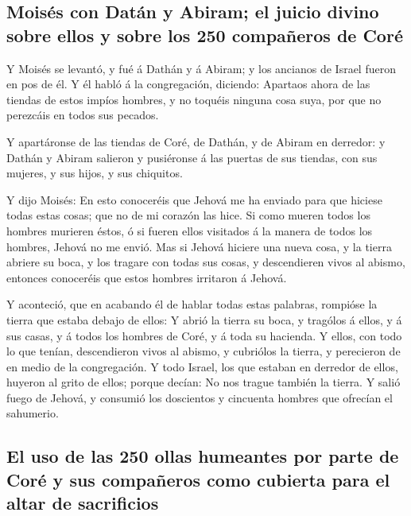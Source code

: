 \hypertarget{moisuxe9s-con-datuxe1n-y-abiram-el-juicio-divino-sobre-ellos-y-sobre-los-250-compauxf1eros-de-coruxe9}{%
\subsection{Moisés con Datán y Abiram; el juicio divino sobre ellos y
sobre los 250 compañeros de
Coré}\label{moisuxe9s-con-datuxe1n-y-abiram-el-juicio-divino-sobre-ellos-y-sobre-los-250-compauxf1eros-de-coruxe9}}

 Y Moisés se levantó, y fué á Dathán y á Abiram; y los
ancianos de Israel fueron en pos de él.  Y él habló á la
congregación, diciendo: Apartaos ahora de las tiendas de estos impíos
hombres, y no toquéis ninguna cosa suya, por que no perezcáis en todos
sus pecados.

 Y apartáronse de las tiendas de Coré, de Dathán, y de
Abiram en derredor: y Dathán y Abiram salieron y pusiéronse á las
puertas de sus tiendas, con sus mujeres, y sus hijos, y sus chiquitos.

 Y dijo Moisés: En esto conoceréis que Jehová me ha
enviado para que hiciese todas estas cosas; que no de mi corazón las
hice.  Si como mueren todos los hombres murieren éstos, ó
si fueren ellos visitados á la manera de todos los hombres, Jehová no me
envió.  Mas si Jehová hiciere una nueva cosa, y la tierra
abriere su boca, y los tragare con todas sus cosas, y descendieren vivos
al abismo, entonces conoceréis que estos hombres irritaron á Jehová.

 Y aconteció, que en acabando él de hablar todas estas
palabras, rompióse la tierra que estaba debajo de ellos: 
Y abrió la tierra su boca, y tragólos á ellos, y á sus casas, y á todos
los hombres de Coré, y á toda su hacienda.  Y ellos, con
todo lo que tenían, descendieron vivos al abismo, y cubriólos la tierra,
y perecieron de en medio de la congregación.  Y todo
Israel, los que estaban en derredor de ellos, huyeron al grito de ellos;
porque decían: No nos trague también la tierra.  Y salió
fuego de Jehová, y consumió los doscientos y cincuenta hombres que
ofrecían el sahumerio.

\hypertarget{el-uso-de-las-250-ollas-humeantes-por-parte-de-coruxe9-y-sus-compauxf1eros-como-cubierta-para-el-altar-de-sacrificios}{%
\subsection{El uso de las 250 ollas humeantes por parte de Coré y sus
compañeros como cubierta para el altar de
sacrificios}\label{el-uso-de-las-250-ollas-humeantes-por-parte-de-coruxe9-y-sus-compauxf1eros-como-cubierta-para-el-altar-de-sacrificios}}

